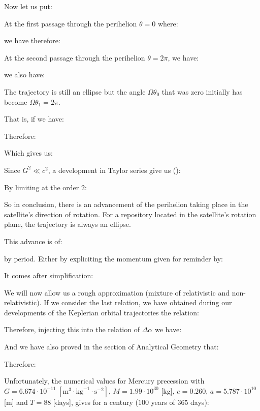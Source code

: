 	Now let us put:
	
	At the first passage through the perihelion $\theta=0$ where:
	
	we have therefore:
	
	At the second passage through the perihelion $\theta=2\pi$, we have:
	
	we also have:
	
	The trajectory is still an ellipse but the angle $\Omega\theta_0$ that was zero initially has become $\Omega\theta_1=2\pi$.

	That is, if we have:
	
	Therefore:
	
	Which gives us:
	
	Since $G^2\ll c^2$, a development in Taylor series give us ():
	
	By limiting at the order $2$:
	
	So in conclusion, there is an advancement of the perihelion taking place in the satellite's direction of rotation. For a repository located in the satellite's rotation plane, the trajectory is always an ellipse.

	This advance is of:
	
	by period. Either by expliciting the momentum given for reminder by:
	
	It comes after simplification:
	
	We will now allow us a rough approximation (mixture of relativistic and non-relativistic). If we consider the last relation, we have obtained during our developments of the Keplerian orbital trajectories the relation:
	
	Therefore, injecting this into the relation of $\Delta \alpha$	we have:
	
	And we have also proved in the section of Analytical Geometry that:
	
	Therefore:
	
	Unfortunately, the numerical values for Mercury precession with $G=6.674\cdot 10^{-11}\;[\text{m}^3\cdot\text{kg}^{-1}\cdot \text{s}^{-2} ]$, $M=1.99\cdot 10^{30}$ [kg], $e=0.260$, $a=5.787\cdot 10^{10}$ [m] and $T=88$ [days], gives for a century ($100$ years of $365$ days):
	
